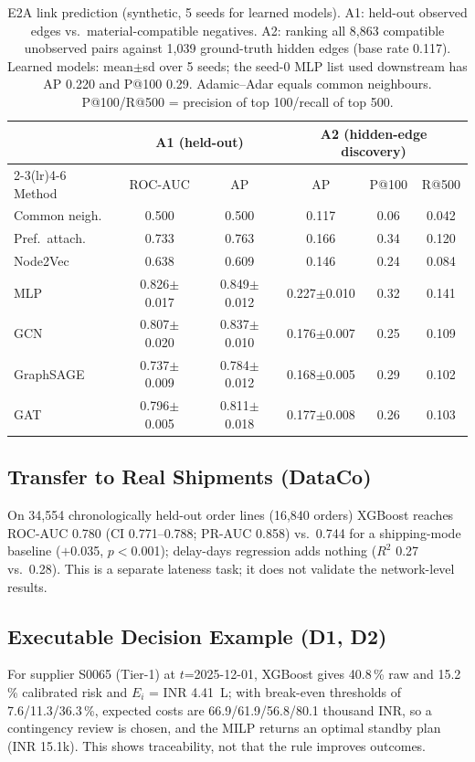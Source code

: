 \documentclass[conference]{IEEEtran}
\newcommand{\DcXgbAUC}{0.780}
\newcommand{\DcXgbPR}{0.858}
\newcommand{\DcBaseAUC}{0.744}
\newcommand{\DcRegR}{0.27}
\newcommand{\DcBaseR}{0.28}
\newcommand{\DcTest}{34,554}
\newcommand{\DcCi}{0.771--0.788}
\newcommand{\DcDelta}{0.035}
\newcommand{\DcOrders}{16,840}
\begin{document}
\begin{table}[t]\centering\caption{E2A link prediction (synthetic, 5 seeds for learned models). A1: held-out observed edges vs.\ material-compatible negatives. A2: ranking all 8,863 compatible unobserved pairs against 1,039 ground-truth hidden edges (base rate 0.117). Learned models: mean$\pm$sd over 5 seeds; the seed-0 MLP list used downstream has AP 0.220 and P@100 0.29. Adamic--Adar equals common neighbours. P@100/R@500 = precision of top 100/recall of top 500.}\label{tab:exp2a}\scriptsize\setlength{\tabcolsep}{2.6pt}\begin{tabular}{lccccc}\toprule
 & \multicolumn{2}{c}{A1 (held-out)} & \multicolumn{3}{c}{A2 (hidden-edge discovery)}\\\cmidrule(lr){2-3}\cmidrule(lr){4-6}
Method & ROC-AUC & AP & AP & P@100 & R@500\\\midrule
Common neigh. & 0.500 & 0.500 & 0.117 & 0.06 & 0.042 \\
Pref.~attach. & 0.733 & 0.763 & 0.166 & 0.34 & 0.120 \\
Node2Vec & 0.638 & 0.609 & 0.146 & 0.24 & 0.084 \\
MLP & 0.826$\pm$0.017 & 0.849$\pm$0.012 & 0.227$\pm$0.010 & 0.32 & 0.141 \\
GCN & 0.807$\pm$0.020 & 0.837$\pm$0.010 & 0.176$\pm$0.007 & 0.25 & 0.109 \\
GraphSAGE & 0.737$\pm$0.009 & 0.784$\pm$0.012 & 0.168$\pm$0.005 & 0.29 & 0.102 \\
GAT & 0.796$\pm$0.005 & 0.811$\pm$0.018 & 0.177$\pm$0.008 & 0.26 & 0.103 \\
\bottomrule\end{tabular}\end{table}

\subsection{Transfer to Real Shipments (DataCo)}
On \DcTest{} chronologically held-out order lines (\DcOrders{} orders) XGBoost reaches ROC-AUC \DcXgbAUC{} (CI \DcCi; PR-AUC \DcXgbPR) vs.\
\DcBaseAUC{} for a shipping-mode baseline ($+$\DcDelta, $p<$0.001); delay-days regression adds nothing ($R^2$ \DcRegR{} vs.\ \DcBaseR). This is a separate lateness task; it does not validate the network-level results.

\subsection{Executable Decision Example (D1, D2)}
For supplier S0065 (Tier-1) at $t$=2025-12-01, XGBoost gives 40.8\,\% raw and 15.2\,\% calibrated risk and $E_i$ = INR 4.41~L; with
break-even thresholds of 7.6/11.3/36.3\,\%, expected costs are 66.9/61.9/56.8/80.1 thousand INR, so a contingency review is chosen, and the
MILP returns an optimal standby plan (INR 15.1k). This shows traceability, not that the rule improves outcomes.
\end{document}
